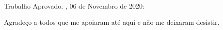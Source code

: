 \documentclass[
	12pt,				%
	openright,			%
	oneside,			%
	a4paper,			%
	english,			%
	french,				%
	spanish,			%
	brazil				%
	]{abntex2}
\begin{document}
\begin{folhadeaprovacao}
  \begin{center}
    {\ABNTEXchapterfont\large\imprimirautor}
    \vspace*{\fill}\vspace*{\fill}
    \begin{center}
      \ABNTEXchapterfont\bfseries\Large\imprimirtitulo
    \end{center}
    \vspace*{\fill}
    \hspace{.45\textwidth}
    \begin{minipage}{.5\textwidth}
        \imprimirpreambulo
    \end{minipage}%
    \vspace*{\fill}
   \end{center}
   Trabalho Aprovado. \imprimirlocal, 06 de Novembro de 2020:
   \begin{center}
    \vspace*{0.5cm}
    {\large\imprimirlocal}
    \par
    {\large\imprimirdata}
    \vspace*{1cm}
  \end{center}  
\end{folhadeaprovacao}




\begin{agradecimentos}
Agradeço a todos que me apoiaram até aqui e não me deixaram desistir.
\end{agradecimentos}
\end{document}
